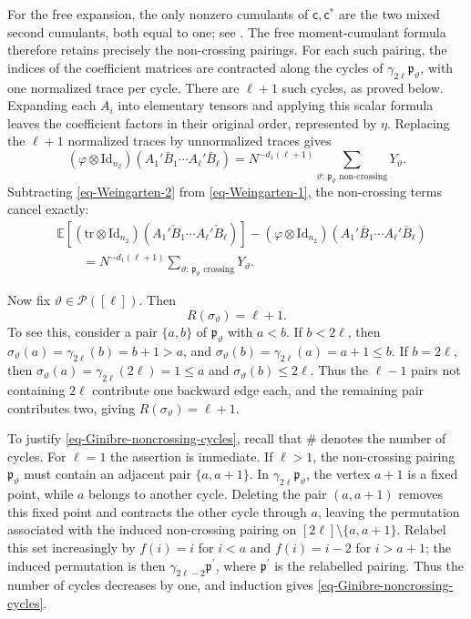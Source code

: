 \documentclass[12pt]{article}
\numberwithin{equation}{section}
\theoremstyle{plain}
\def\bE{\mathbb E}
\def\cP{\mathcal P}
\def\id{\mathrm {Id}}
\def\tr{\mathrm {tr}}
\begin{document}
For the free expansion, the only nonzero cumulants of $\mathsf c,\mathsf c^*$ are the two mixed second cumulants, both equal to one; see \cite[Example~11.23]{NicaSpeicher2006}. The free moment-cumulant formula therefore retains precisely the non-crossing pairings. For each such pairing, the indices of the coefficient matrices are contracted along the cycles of $\gamma_{2\ell} \mathfrak p_\vartheta$, with one normalized trace per cycle. There are $\ell+1$ such cycles, as proved below. Expanding each $A_i$ into elementary tensors and applying this scalar formula leaves the coefficient factors in their original order, represented by $\eta$. Replacing the $\ell+1$ normalized traces by unnormalized traces gives
\begin{equation}\label{eq-Weingarten-2}
(\varphi\otimes\id_{n_2})(A_1'\bar B_1\cdots A_\ell'\bar B_\ell)
=N^{-d_1(\ell+1)}\sum_{\vartheta:\,\mathfrak p_\vartheta\text{ non-crossing}}Y_\vartheta.
\end{equation}
Subtracting \eqref{eq-Weingarten-2} from \eqref{eq-Weingarten-1}, the non-crossing terms cancel exactly:
\begin{equation}\label{eq-Weingarten}
\begin{aligned}
&\bE[(\tr\otimes\id_{n_2})(A_1'\check B_1\cdots A_\ell'\check B_\ell)]
-(\varphi\otimes\id_{n_2})(A_1'\bar B_1\cdots A_\ell'\bar B_\ell)
\\
&\qquad=N^{-d_1(\ell+1)}\sum_{\vartheta:\,\mathfrak p_\vartheta\text{ crossing}}Y_\vartheta.
\end{aligned}
\end{equation}

Now fix $\vartheta\in\cP([\ell])$. Then
\begin{equation}\label{eq-R(sigma)}
R(\sigma_\vartheta)=\ell+1.
\end{equation}
To see this, consider a pair $\{a,b\}$ of $\mathfrak p_\vartheta$ with $a<b$. If $b<2\ell$, then $\sigma_\vartheta(a) = \gamma_{2\ell}(b) = b+1 > a$, and $\sigma_\vartheta(b) = \gamma_{2\ell}(a) = a+1 \le b$. If $b=2\ell$, then $\sigma_\vartheta(a) = \gamma_{2\ell}(2\ell) = 1\le a$ and $\sigma_\vartheta(b) \le 2\ell$. Thus the $\ell-1$ pairs not containing $2\ell$ contribute one backward edge each, and the remaining pair contributes two, giving $R(\sigma_\vartheta)=\ell+1$.

To justify \eqref{eq-Ginibre-noncrossing-cycles}, recall that $\#$ denotes the number of cycles. For $\ell=1$ the assertion is immediate. If $\ell>1$, the non-crossing pairing $\mathfrak p_\vartheta$ must contain an adjacent pair $\{a,a+1\}$. In $\gamma_{2\ell} \mathfrak p_\vartheta$, the vertex $a+1$ is a fixed point, while $a$ belongs to another cycle. Deleting the pair $(a,a+1)$ removes this fixed point and contracts the other cycle through $a$, leaving the permutation associated with the induced non-crossing pairing on $[2\ell]\setminus\{a,a+1\}$. Relabel this set increasingly by $f(i)=i$ for $i<a$ and $f(i)=i-2$ for $i>a+1$; the induced permutation is then $\gamma_{2\ell-2}\mathfrak p^{\prime}$, where $\mathfrak p^{\prime}$ is the relabelled pairing. Thus the number of cycles decreases by one, and induction gives \eqref{eq-Ginibre-noncrossing-cycles}.
\end{document}
